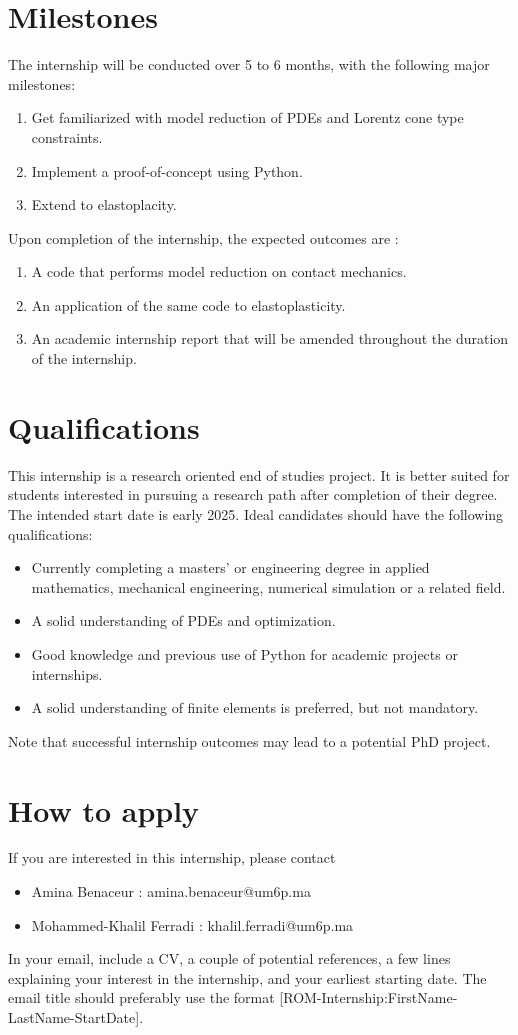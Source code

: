 \documentclass[12pt]{article}
\begin{document}
	\section{Milestones}
	The internship will be conducted over 5 to 6 months, with the following major milestones:
	\begin{enumerate}
		\item Get familiarized with model reduction of PDEs and Lorentz cone type constraints.
		\item Implement a proof-of-concept using Python.
		\item Extend to elastoplacity.
	\end{enumerate}
	Upon completion of the internship, the expected outcomes are :
	\begin{enumerate}
		\item A code that performs model reduction on contact mechanics.
		\item An application of the same code to elastoplasticity.
		\item An academic internship report that will be amended throughout the duration of the internship.
		\end{enumerate}
	
	
	\section{Qualifications}
	This internship is a research oriented end of studies project. It is better suited for students interested in pursuing a research path after completion of their degree. The intended start date is early 2025. Ideal candidates should have the following qualifications:
	\begin{itemize}
		\item Currently completing a masters' or engineering degree in applied mathematics, mechanical engineering, numerical simulation or a related field.
		\item A solid understanding of PDEs and optimization.
		\item Good knowledge and previous use of Python for academic projects or internships.
		\item A solid understanding of finite elements is preferred, but not mandatory.
	\end{itemize}
	Note that successful internship outcomes may lead to a potential PhD project.
	\section{How to apply}
	If you are interested in this internship, please contact 
	\begin{itemize}
		\item Amina Benaceur : amina.benaceur@um6p.ma
		\item Mohammed-Khalil Ferradi : khalil.ferradi@um6p.ma
	\end{itemize}
	In your email, include a CV, a couple of potential references, a few lines explaining your interest in the internship, and your earliest starting date.
	The email title should preferably use the format [ROM-Internship:FirstName-LastName-StartDate].
	
	
\end{document}
